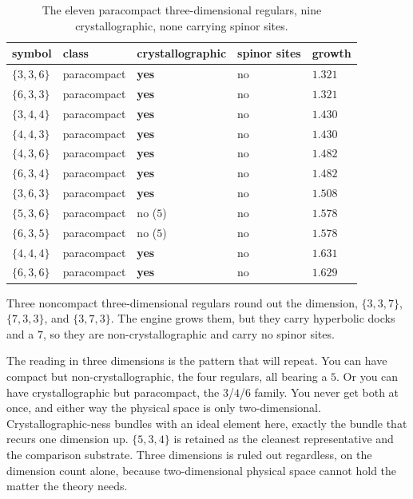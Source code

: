 \begin{table}[ht]
\centering
\begin{tabular}{@{}lllll@{}}
\toprule
symbol & class & crystallographic & spinor sites & growth \\
\midrule
$\{3,3,6\}$ & paracompact & \textbf{yes} & no & $1.321$ \\
$\{6,3,3\}$ & paracompact & \textbf{yes} & no & $1.321$ \\
$\{3,4,4\}$ & paracompact & \textbf{yes} & no & $1.430$ \\
$\{4,4,3\}$ & paracompact & \textbf{yes} & no & $1.430$ \\
$\{4,3,6\}$ & paracompact & \textbf{yes} & no & $1.482$ \\
$\{6,3,4\}$ & paracompact & \textbf{yes} & no & $1.482$ \\
$\{3,6,3\}$ & paracompact & \textbf{yes} & no & $1.508$ \\
$\{5,3,6\}$ & paracompact & no ($5$) & no & $1.578$ \\
$\{6,3,5\}$ & paracompact & no ($5$) & no & $1.578$ \\
$\{4,4,4\}$ & paracompact & \textbf{yes} & no & $1.631$ \\
$\{6,3,6\}$ & paracompact & \textbf{yes} & no & $1.629$ \\
\bottomrule
\end{tabular}
\caption{The eleven paracompact three-dimensional regulars, nine crystallographic, none carrying spinor sites.}
\label{tab:catalog-3d-paracompact}
\end{table}

Three noncompact three-dimensional regulars round out the dimension, $\{3,3,7\}$, $\{7,3,3\}$, and $\{3,7,3\}$. The engine grows them, but they carry hyperbolic docks and a $7$, so they are non-crystallographic and carry no spinor sites.

The reading in three dimensions is the pattern that will repeat. You can have compact but non-crystallographic, the four regulars, all bearing a $5$. Or you can have crystallographic but paracompact, the $3$/$4$/$6$ family. You never get both at once, and either way the physical space is only two-dimensional. Crystallographic-ness bundles with an ideal element here, exactly the bundle that recurs one dimension up. $\{5,3,4\}$ is retained as the cleanest representative and the comparison substrate. Three dimensions is ruled out regardless, on the dimension count alone, because two-dimensional physical space cannot hold the matter the theory needs.

